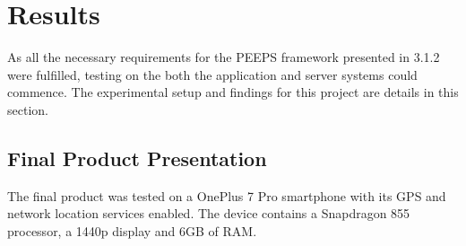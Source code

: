\chapter{Results}
As all the necessary requirements for the PEEPS framework presented in 3.1.2 were fulfilled, testing on the both the application and server systems could commence. The experimental setup and findings for this project are details in this section.


\section{Final Product Presentation}
The final product was tested on a OnePlus 7 Pro smartphone with its GPS and network location services enabled. The device contains a Snapdragon 855 processor, a 1440p display and 6GB of RAM.

